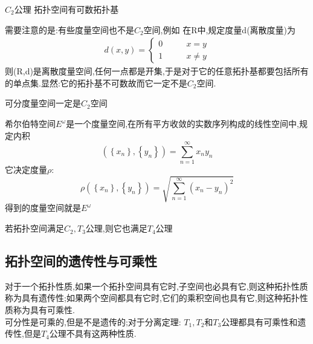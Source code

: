 \begin{definition}
    \(C_2 \textbf{公理}\) 拓扑空间有可数拓扑基
\end{definition}
需要注意的是:有些度量空间也不是\(C_2\)空间,例如 在R中,规定度量d(离散度量)为\begin{align}
    d(x,y)= \begin{cases}
        0   \qquad &x=y \\
        1   \qquad &x\neq y 
    \end{cases}
\end{align} 
 则(R,d)是离散度量空间,任何一点都是开集,于是对于它的任意拓扑基都要包括所有的单点集.显然:它的拓扑基不可数故而它一定不是\(C_2\)空间.
\begin{corollary}
    可分度量空间一定是\(C_2\)空间
\end{corollary}
\begin{example}
    \(\textbf{希尔伯特空间}\)\(E^{\omega}\)是一个度量空间,在所有平方收敛的实数序列构成的线性空间中,规定内积
    \[(\left\{x_n\right\},\left\{y_n\right\})= \sum\limits_{n=1}^{\infty}x_ny_n\]
    它决定度量\(\rho\):
    \[\rho(\left\{x_n\right\},\left\{y_n\right\}) = \sqrt{\sum\limits_{n=1}^{\infty}(x_n-y_n)^2}\]
    得到的度量空间就是\(E^{\omega}\)
\end{example}
\begin{theorem}[Lindelof 定理]\label{林登夫定理}
    若拓扑空间满足\(C_2 ,T_3\)公理,则它也满足\(T_4\)公理
\end{theorem}
\subsection*{拓扑空间的遗传性与可乘性}
对于一个拓扑性质,如果一个拓扑空间具有它时,子空间也必具有它,则这种拓扑性质称为具有遗传性;如果两个空间都具有它时,它们的乘积空间也具有它,则这种拓扑性质称为具有可乘性. 
\\
可分性是可乘的,但是不是遗传的;对于分离定理: \(T_1,T_2\)和\(T_3\)公理都具有可乘性和遗传性,但是\(T_4\)公理不具有这两种性质.
